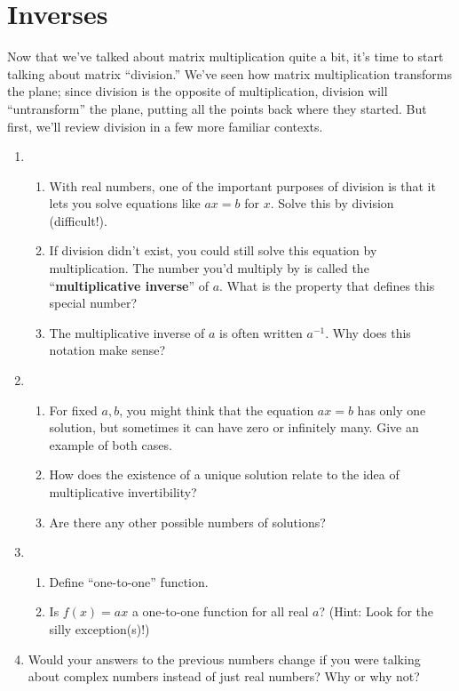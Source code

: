 \documentclass[../gatm.tex]{subfiles}
\begin{document}
\section{Inverses}
\setcounter{problem_i}{0}

Now that we've talked about matrix multiplication quite a bit, it's time to start talking about matrix ``division.'' We've seen how matrix multiplication transforms the plane; since division is the opposite of multiplication, division will ``untransform'' the plane, putting all the points back where they started. But first, we'll review division in a few more familiar contexts.

\begin{enumerate}
\setcounter{enumi}{\value{problem_i}}
\item \begin{enumerate}
\item With real numbers, one of the important purposes of division is that it lets you solve equations like $ax=b$ for $x$. Solve this by division (difficult!).
\item If division didn't exist, you could still solve this equation by multiplication. The number you'd multiply by is called the ``\textbf{multiplicative inverse}'' of $a$. What is the property that defines this special number?
\item The multiplicative inverse of $a$ is often written $a^{-1}$. Why does this notation make sense?
\end{enumerate}
\item \begin{enumerate}
\item For fixed $a,b$, you might think that the equation $ax=b$ has only one solution, but sometimes it can have zero or infinitely many. Give an example of both cases.
\item How does the existence of a unique solution relate to the idea of multiplicative invertibility?
\item Are there any other possible numbers of solutions?
\end{enumerate}
\item \begin{enumerate}
\item Define ``one-to-one'' function.
\item Is $f(x)=ax$ a one-to-one function for all real $a$? (Hint: Look for the silly exception(s)!)
\end{enumerate}
\item Would your answers to the previous numbers change if you were talking about complex numbers instead of just real numbers? Why or why not?
\setcounter{problem_i}{\value{enumi}}
\end{enumerate}
\end{document}
